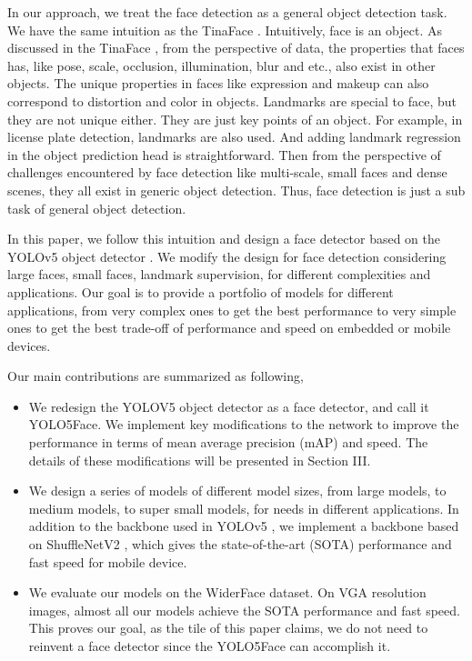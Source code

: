 \documentclass[conference]{IEEEtran}
\begin{document}
In our approach, we treat the face detection as a general object detection task.  We have the same intuition as the TinaFace \cite{TinaFace}. Intuitively, face is an object. As discussed in the TinaFace \cite{TinaFace}, from the perspective of data, the properties that faces has, like pose, scale, occlusion, illumination, blur and etc., also exist in other objects. The unique properties in faces like expression and makeup can also correspond to distortion and color in objects.  Landmarks are special to face, but they are not unique either. They are just key points of an object. For example, in license plate detection, landmarks are also used. And adding landmark regression in the object prediction head is straightforward. Then from the perspective of challenges encountered by face detection like multi-scale, small faces and dense scenes, they all exist in generic object detection. Thus, face detection is just a sub task of general object detection. 

In this paper, we follow this intuition and design a face detector based on the YOLOv5 object detector \cite{YOLOv5}. We modify the design for face detection considering large faces, small faces, landmark supervision, for different complexities and applications. Our goal is to provide a portfolio of models for different applications, from very complex ones to get the best performance to very simple ones to get the best trade-off of performance and speed on embedded or mobile devices.  

Our main contributions are summarized as following, 
\begin{itemize}
\item {We redesign the YOLOV5 object detector \cite{YOLOv5} as a face detector, and call it YOLO5Face. We implement key modifications to the network to improve the performance in terms of mean average precision (mAP) and speed. The details of these modifications will be presented in Section III.}
\item {We design a series of models of different model sizes, from large models, to medium models, to super small models, for needs in different applications. In addition to the backbone used in YOLOv5 \cite{YOLOv5}, we implement a backbone based on ShuffleNetV2 \cite{ShuffleNetv2}, which gives the state-of-the-art (SOTA) performance and fast speed for mobile device.} 
\item {We evaluate our models on the WiderFace \cite{WiderFace} dataset. On VGA resolution images, almost all our models achieve the SOTA performance and fast speed. This proves our goal, as the tile of this paper claims, we do not need to reinvent a face detector since the YOLO5Face can accomplish it.} 


\end{itemize}
\end{document}
